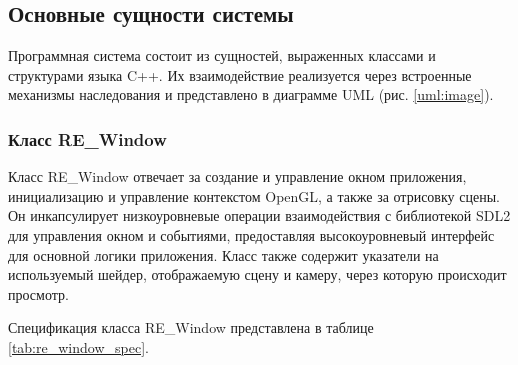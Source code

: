 \subsection{Основные сущности системы}

Программная система состоит из сущностей, выраженных классами и структурами языка C++. Их взаимодействие реализуется через встроенные механизмы наследования и представлено в диаграмме UML (рис. \ref{uml:image}).


\subsubsection{Класс RE\_Window}
Класс RE\_Window отвечает за создание и управление окном приложения, инициализацию и управление контекстом OpenGL, а также за отрисовку сцены. Он инкапсулирует низкоуровневые операции взаимодействия с библиотекой SDL2 для управления окном и событиями, предоставляя высокоуровневый интерфейс для основной логики приложения. Класс также содержит указатели на используемый шейдер, отображаемую сцену и камеру, через которую происходит просмотр.

Спецификация класса RE\_Window представлена в таблице \ref{tab:re_window_spec}.

